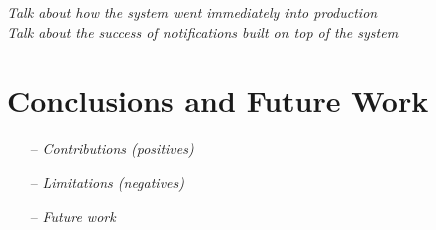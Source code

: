 \documentclass[english,12pt,a4paper,pdftex,sci,utf8]{aaltothesis}
\theoremstyle{definition}
\newcommand{\nyi}[1]{\noindent\colorbox{nyibg}{\textcolor{nyitext}{\emph{#1}}}}
\begin{document}
\nyi{Talk about how the system went immediately into production}\\
\nyi{Talk about the success of notifications built on top of the system}


\clearpage
\section{Conclusions and Future Work} 
\label{sec:conclusions}

\begin{itemize}
\item[--]\nyi{Contributions (positives)}
\item[--]\nyi{Limitations (negatives)}
\item[--]\nyi{Future work}
\end{itemize}


\clearpage

{}

\printbibliography

\end{document}
